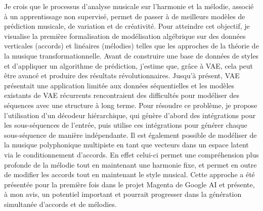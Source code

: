 Je crois que le processus d'analyse musicale sur l'harmonie et la mélodie, associé à un apprentissage non supervisé, permet de passer à de meilleurs modèles de prédiction musicale, de variation et de créativité. Pour atteindre cet objectif, je visualise la première formalisation de modélisation algébrique sur des données verticales (accords) et linéaires (mélodies) telles que les approches de la théorie de la musique transformationnelle. Avant de construire une base de données de styles et d’appliquer un algorithme de prédiction, j’estime que, grâce à VAE, cela peut être avancé et produire des résultats révolutionnaires.
Jusqu'à présent, VAE présentait une application limitée aux données séquentielles et les modèles existants de VAE récurrents rencontraient des difficultés pour modéliser des séquences avec une structure à long terme. Pour résoudre ce problème, je propose l’utilisation d’un décodeur hiérarchique, qui génère d’abord des intégrations pour les sous-séquences de l’entrée, puis utilise ces intégrations pour générer chaque sous-séquence de manière indépendante. Il est également possible de modéliser de la musique polyphonique multipiste en tant que vecteurs dans un espace latent via le conditionnement d'accords. En effet celui-ci permet une compréhension plus profonde de la mélodie tout en maintenant une harmonie fixe, et permet en outre de modifier les accords tout en maintenant le style musical. Cette approche a été présentée pour la première fois dans le projet Magenta de Google AI et présente, à mon avis, un potentiel important et pourrait progresser dans la génération simultanée d'accords et de mélodies.
